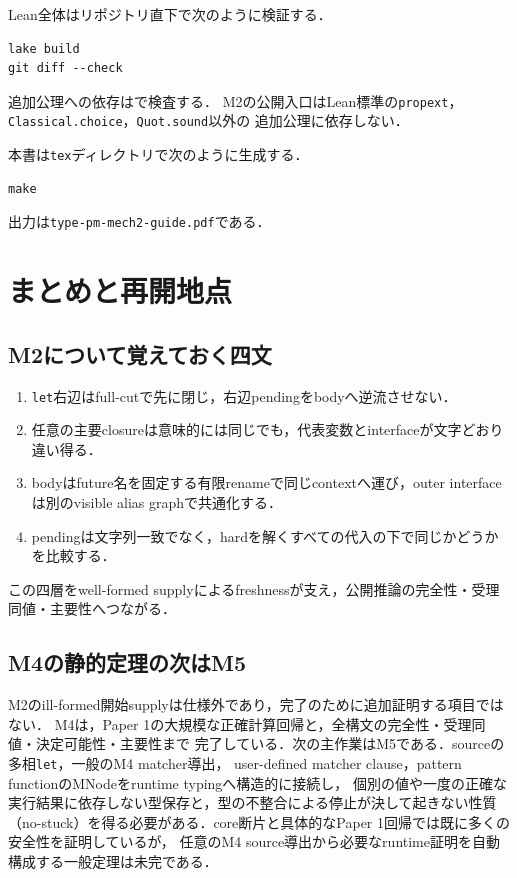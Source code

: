 \documentclass[11pt,a4paper,oneside]{ltjsbook}
\newcommand{\code}[1]{\texttt{#1}}
\begin{document}
Lean全体はリポジトリ直下で次のように検証する．

\begin{lstlisting}
lake build
git diff --check
\end{lstlisting}

追加公理への依存はで検査する．
M2の公開入口はLean標準の\code{propext}，\code{Classical.choice}，\code{Quot.sound}以外の
追加公理に依存しない．

本書は\code{tex}ディレクトリで次のように生成する．

\begin{lstlisting}
make
\end{lstlisting}

出力は\code{type-pm-mech2-guide.pdf}である．

\chapter{まとめと再開地点}

\section{M2について覚えておく四文}

\begin{enumerate}[leftmargin=2em]
  \item \code{let}右辺はfull-cutで先に閉じ，右辺pendingをbodyへ逆流させない．
  \item 任意の主要closureは意味的には同じでも，代表変数とinterfaceが文字どおり違い得る．
  \item bodyはfuture名を固定する有限renameで同じcontextへ運び，outer interfaceは別のvisible alias graphで共通化する．
  \item pendingは文字列一致でなく，hardを解くすべての代入の下で同じかどうかを比較する．
\end{enumerate}

この四層をwell-formed supplyによるfreshnessが支え，公開推論の完全性・受理同値・主要性へつながる．

\section{M4の静的定理の次はM5}

M2のill-formed開始supplyは仕様外であり，完了のために追加証明する項目ではない．
M4は，Paper 1の大規模な正確計算回帰と，全構文の完全性・受理同値・決定可能性・主要性まで
完了している．次の主作業はM5である．sourceの多相\code{let}，一般のM4 matcher導出，
user-defined matcher clause，pattern functionのMNodeをruntime typingへ構造的に接続し，
個別の値や一度の正確な実行結果に依存しない型保存と，型の不整合による停止が決して起きない性質
（no-stuck）を得る必要がある．core断片と具体的なPaper 1回帰では既に多くの安全性を証明しているが，
任意のM4 source導出から必要なruntime証明を自動構成する一般定理は未完である．
\end{document}
